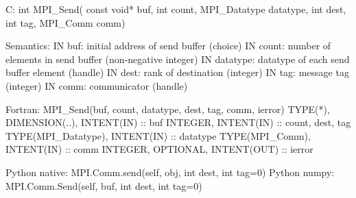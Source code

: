 C:
int MPI_Send(
  const void* buf, int count, MPI_Datatype datatype,
  int dest, int tag, MPI_Comm comm)

Semantics:
IN buf: initial address of send buffer (choice)
IN count: number of elements in send buffer (non-negative integer)
IN datatype: datatype of each send buffer element (handle)
IN dest: rank of destination (integer)
IN tag: message tag (integer)
IN comm: communicator (handle)

Fortran:
MPI_Send(buf, count, datatype, dest, tag, comm, ierror)
TYPE(*), DIMENSION(..), INTENT(IN) :: buf
INTEGER, INTENT(IN) :: count, dest, tag
TYPE(MPI_Datatype), INTENT(IN) :: datatype
TYPE(MPI_Comm), INTENT(IN) :: comm
INTEGER, OPTIONAL, INTENT(OUT) :: ierror 

Python native:
MPI.Comm.send(self, obj, int dest, int tag=0)
Python numpy:
MPI.Comm.Send(self, buf, int dest, int tag=0)
